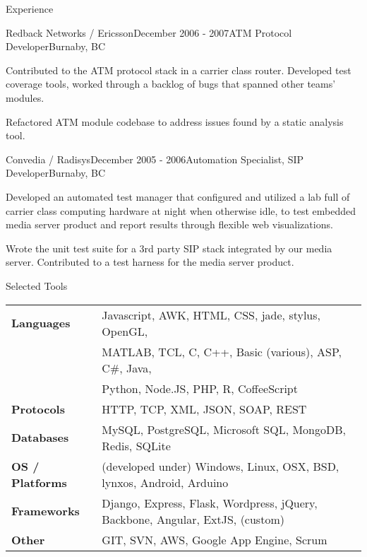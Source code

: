 \documentclass{resume} %
\begin{document}
\begin{rSection}{Experience}

\begin{rSubsection}{Redback Networks / Ericsson}{December 2006 - 2007}{ATM Protocol Developer}{Burnaby, BC}
\item Contributed to the ATM protocol stack in a carrier class router. Developed test coverage tools, worked through a backlog of bugs that spanned other teams’ modules.
\item Refactored ATM module codebase to address issues found by a static analysis tool.

\end{rSubsection}
\begin{rSubsection}{Convedia / Radisys}{December 2005 - 2006}{Automation Specialist, SIP Developer}{Burnaby, BC}
\item Developed an automated test manager that configured and utilized a lab full of carrier class computing hardware at night when otherwise idle, to test embedded media server product and report results through flexible web visualizations.
\item Wrote the unit test suite for a 3rd party SIP stack integrated by our media server. Contributed to a test harness for the media server product.
\end{rSubsection}

\end{rSection}


\begin{rSection}{Selected Tools}
\begin{tabular}{ @{} >{\bfseries}l @{\hspace{6ex}} l }
Languages & Javascript, AWK, HTML, CSS, jade, stylus, OpenGL, \\
 & MATLAB, TCL, C, C++, Basic (various), ASP, C\#, Java, \\
 & Python, Node.JS, PHP, R, CoffeeScript \\
Protocols & HTTP, TCP, XML, JSON, SOAP, REST \\
Databases & MySQL, PostgreSQL, Microsoft SQL, MongoDB, Redis, SQLite \\
OS / Platforms & (developed under) Windows, Linux, OSX, BSD, lynxos, Android, Arduino \\
Frameworks & Django, Express, Flask, Wordpress, jQuery, Backbone, Angular, ExtJS, (custom) \\
Other & GIT, SVN, AWS, Google App Engine, Scrum \\
\end{tabular}
\end{rSection}
\end{document}
